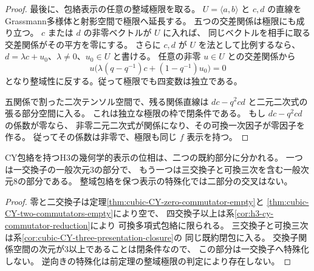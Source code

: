 \begin{proof}
最後に、包絡表示の任意の整域極限を取る。
$U=\langle a,b\rangle$ と $c,d$ の直線をGrassmann多様体と射影空間で極限へ延長する。
五つの交差関係は極限にも成り立つ。
$c$ または $d$ の非零ベクトルが $U$ に入れば、
同じベクトルを相手に取る交差関係がその平方を零にする。
さらに $c,d$ が $U$ を法として比例するなら、
$d=\lambda c+u_0$、$\lambda\ne0$、$u_0\in U$ と書ける。
任意の非零 $u\in U$ との交差関係から
\[
 u\bigl(\lambda(q-q^{-1})c+(1-q^{-1})u_0\bigr)=0
\]
となり整域性に反する。従って極限でも四変数は独立である。

五関係で割った二次テンソル空間で、残る関係直線は
$dc-q^2cd$ と二元二次式の張る部分空間に入る。
これは独立な極限の枠で閉条件である。
もし $dc-q^2cd$ の係数が零なら、
非零二元二次式が関係になり、その可換一次因子が零因子を作る。
従ってその係数は非零で、極限も同じ $f$ 表示を持つ。
\end{proof}

\begin{corollary}\label{cor:cubic-CY-presentation-two-components}
CY包絡を持つH3の幾何学的表示の位相は、二つの既約部分に分かれる。
一つは一交換子の一般次元3の部分で、
もう一つは三交換子と可換三次を含む一般次元8の部分である。
整域包絡を保つ表示の特殊化では二部分の交叉はない。
\end{corollary}
\begin{proof}
零と二交換子は定理\ref{thm:cubic-CY-zero-commutator-empty}と
\ref{thm:cubic-CY-two-commutators-empty}により空で、
四交換子以上は系\ref{cor:h3-cy-commutator-reduction}により
可換多項式包絡に限られる。
三交換子と可換三次は系\ref{cor:cubic-CY-three-presentation-closure}の
同じ既約閉包に入る。
交換子関係空間の次元が3以上であることは閉条件なので、
この部分は一交換子へ特殊化しない。
逆向きの特殊化は前定理の整域極限の判定により存在しない。
\end{proof}
